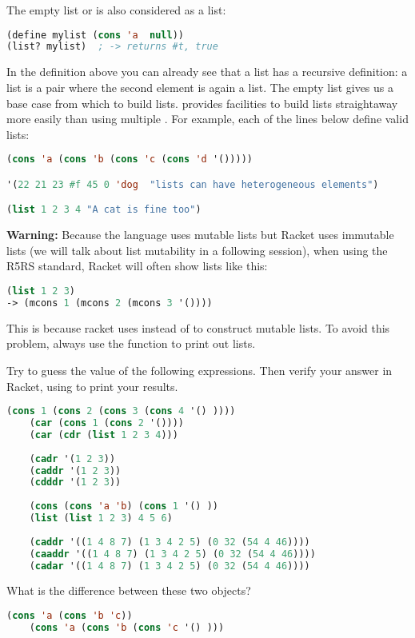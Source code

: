 \documentclass{../../../tp}
\begin{document}
The empty list  or  is also considered as a list:
\begin{lstlisting}[language=lisp]
(define mylist (cons 'a  null))
(list? mylist) 	; -> returns #t, true
\end{lstlisting}

In the definition above you can already see that a list has a recursive definition: a list is a pair where the second element is again a list. The empty list  gives us a base case from which to build lists. \scheme provides facilities to build lists straightaway more easily than using multiple . For example, each of the lines below define valid lists:

\begin{lstlisting}[language=lisp]
(cons 'a (cons 'b (cons 'c (cons 'd '()))))

'(22 21 23 #f 45 0 'dog  "lists can have heterogeneous elements")

(list 1 2 3 4 "A cat is fine too")
\end{lstlisting}

\textbf{Warning:} Because the \scheme language uses mutable lists but Racket uses immutable lists (we will talk about list mutability in a following session), when using the R5RS standard, Racket will often show lists like this:

\begin{lstlisting}[language=lisp]
(list 1 2 3)
-> (mcons 1 (mcons 2 (mcons 3 '())))
\end{lstlisting}

This is because racket uses  instead of  to construct mutable lists. To avoid this problem, always use the  function to print out lists.

\begin{instruction}
Try to guess the value of the following expressions. Then verify your answer in Racket, using  to print your results.

\begin{lstlisting}[language=lisp]
	(cons 1 (cons 2 (cons 3 (cons 4 '() ))))
	(car (cons 1 (cons 2 '())))
	(car (cdr (list 1 2 3 4)))
	
	(cadr '(1 2 3))
	(caddr '(1 2 3))
	(cdddr '(1 2 3))
	
	(cons (cons 'a 'b) (cons 1 '() ))
	(list (list 1 2 3) 4 5 6)
	
	(caddr '((1 4 8 7) (1 3 4 2 5) (0 32 (54 4 46))))
	(caaddr '((1 4 8 7) (1 3 4 2 5) (0 32 (54 4 46))))
	(cadar '((1 4 8 7) (1 3 4 2 5) (0 32 (54 4 46))))
\end{lstlisting}
	
What is the difference between these two objects?
		
	\begin{lstlisting}[language=lisp]
	(cons 'a (cons 'b 'c))
	(cons 'a (cons 'b (cons 'c '() ))) 	
	\end{lstlisting}
			
\end{instruction}
\end{document}
